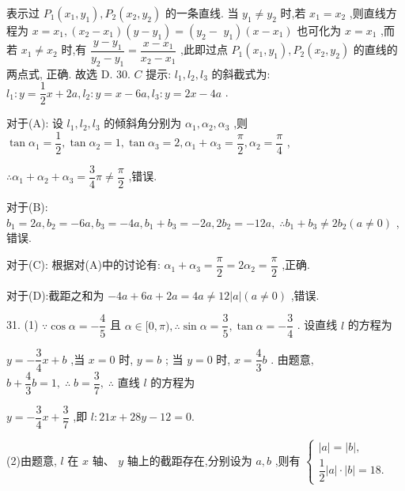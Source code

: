 表示过 ${P}_{1}\left( {{x}_{1},{y}_{1}}\right) ,{P}_{2}\left( {{x}_{2},{y}_{2}}\right)$ 的一条直线. 当 ${y}_{1} \neq  {y}_{2}$ 时,若 ${x}_{1} = {x}_{2}$ ,则直线方程为 $x = {x}_{1},\left( {{x}_{2} - {x}_{1}}\right) \left( {y - {y}_{1}}\right)  = \left( {{y}_{2} - }\right.$  $\left. {y}_{1}\right) \left( {x - {x}_{1}}\right)$ 也可化为 $x = {x}_{1}$ ,而若 ${x}_{1} \neq  {x}_{2}$ 时,有 $\dfrac{y - {y}_{1}}{{y}_{2} - {y}_{1}} = \dfrac{x - {x}_{1}}{{x}_{2} - {x}_{1}}$ ,此即过点 ${P}_{1}\left( {{x}_{1},{y}_{1}}\right) ,{P}_{2}\left( {{x}_{2},{y}_{2}}\right)$ 的直线的两点式, 正确. 故选 D. 30. $C$ 提示: ${l}_{1},{l}_{2},{l}_{3}$ 的斜截式为: ${l}_{1} : y = \dfrac{1}{2}x + {2a},{l}_{2} : y = x - {6a},{l}_{3} : y = {2x} - {4a}$ .

对于(A): 设 ${l}_{1},{l}_{2},{l}_{3}$ 的倾斜角分别为 ${\alpha }_{1},{\alpha }_{2},{\alpha }_{3}$ ,则 $\tan {\alpha }_{1} = \dfrac{1}{2},\tan {\alpha }_{2} = 1,\tan {\alpha }_{3} = 2,{\alpha }_{1} + {\alpha }_{3} = \dfrac{\pi }{2},{\alpha }_{2} = \dfrac{\pi }{4}$ ,

$\therefore {\alpha }_{1} + {\alpha }_{2} + {\alpha }_{3} = \dfrac{3}{4}\pi  \neq  \dfrac{\pi }{2}$ ,错误.

对于(B): ${b}_{1} = {2a},{b}_{2} =  - {6a},{b}_{3} =  - {4a},{b}_{1} + {b}_{3} =  - {2a},2{b}_{2} =  - {12a},\;\therefore {b}_{1} + {b}_{3} \neq  2{b}_{2}\left( {a \neq  0}\right)$ ,错误.

对于(C): 根据对(A)中的讨论有: ${\alpha }_{1} + {\alpha }_{3} = \dfrac{\pi }{2} = 2{\alpha }_{2} = \dfrac{\pi }{2}$ ,正确.

对于(D):截距之和为 $- {4a} + {6a} + {2a} = {4a} \neq  {12}\left| a\right| \left( {a \neq  0}\right)$ ,错误.

31. (1) $\because \cos \alpha  =  - \dfrac{4}{5}$ 且 $\alpha  \in  \lbrack 0,\pi ),\therefore \sin \alpha  = \dfrac{3}{5},\tan \alpha  =  - \dfrac{3}{4}$ . 设直线 $l$ 的方程为

$y =  - \dfrac{3}{4}x + b$ ,当 $x = 0$ 时, $y = b$ ; 当 $y = 0$ 时, $x = \dfrac{4}{3}b$ . 由题意, $b + \dfrac{4}{3}b = 1,\;\therefore \;b = \dfrac{3}{7},\;\therefore$ 直线 $l$ 的方程为

$y =  - \dfrac{3}{4}x + \dfrac{3}{7}$ ,即 $l : {21x} + {28y} - {12} = 0.$

(2)由题意, $l$ 在 $x$ 轴、 $y$ 轴上的截距存在,分别设为 $a,b$ ,则有 $\left\{  \begin{array}{l} \left| a\right|  = \left| b\right| , \\  \dfrac{1}{2}\left| a\right|  \cdot  \left| b\right|  = {18}. \end{array}\right.$

